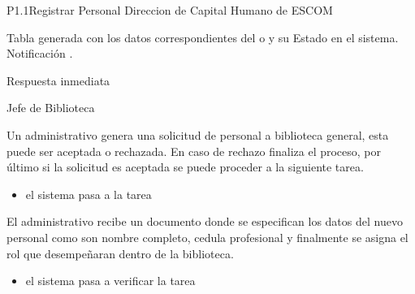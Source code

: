 \begin{Proceso}{P1.1}{Registrar Personal}
   { %
    Direccion de Capital Humano de ESCOM
  }

   { %
    \begin{UClist}
    
      \UCli Tabla generada con los datos correspondientes del  o  y su Estado en el sistema.
      \UCli   Notificación .
    \end{UClist}
  }

   { %
  }

   { %
    \begin{UClist}
      \UCli Respuesta inmediata
      
    \end{UClist}
  }
   { %
}


\end{Proceso}

\begin{PDescripcion}

  \Ppaso Jefe de Biblioteca

    \begin{enumerate}

      \Ppaso[\itarea] Un administrativo genera una solicitud de personal a biblioteca general, esta puede ser aceptada o rechazada. En caso de rechazo finaliza el proceso, por último si la solicitud es aceptada se puede proceder a la siguiente tarea. 
  \begin{itemize}
    \item {} el sistema pasa a la tarea 
  \end{itemize}

\Ppaso[\itarea]  El administrativo recibe un documento donde se especifican los datos del nuevo personal como son nombre completo, cedula profesional y finalmente se asigna el rol que desempeñaran dentro de la biblioteca.

	\begin{itemize}
    \item {} el sistema pasa a verificar la tarea 
  \end{itemize}

    \end{enumerate}
    
    
\end{PDescripcion}


